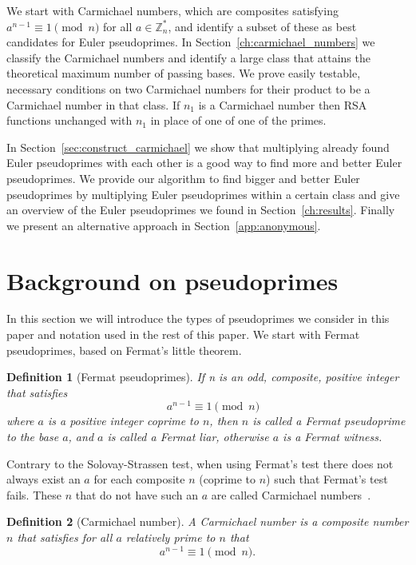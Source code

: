 \documentclass[runningheads]{amsart}
\newtheorem{definition}{Definition}
\newcommand{\Z}{\mathbb{Z}}
\begin{document}
We start with Carmichael numbers,
which are composites satisfying
$a^{n-1}\equiv
1
\pmod
n$ for all $a
\in
\Z_n^*$,
and identify a subset of these as best candidates for Euler pseudoprimes.
In
Section~\ref{ch:carmichael_numbers}
we classify the Carmichael numbers and identify a large class that attains the theoretical
maximum number of passing bases.
We prove easily testable,
necessary conditions on two Carmichael numbers for their product to be a Carmichael
number in that class.
If
$n_1$
is a Carmichael number then RSA functions unchanged with
$n_1$
in place of one of one of the primes.

In
Section~\ref{sec:construct_carmichael}
we show that multiplying already found Euler pseudoprimes with each other is a good
way to find more and better Euler pseudoprimes.
\relax
\relax
We provide our algorithm to find bigger and better Euler pseudoprimes by multiplying
Euler pseudoprimes within a certain class and give an overview of the Euler pseudoprimes
we found in
Section~\ref{ch:results}.
Finally we present an alternative approach in
Section~\ref{app:anonymous}.
\relax

\section{Background on pseudoprimes}
\relax
In this section we will introduce the types of pseudoprimes we consider in this paper
and notation used in the rest of this paper.
We start with Fermat pseudoprimes,
based on Fermat's little theorem.

\begin{definition}[Fermat pseudoprimes]
If n is an odd,
composite,
positive integer that satisfies
\[\quad a^{n-1} \equiv 1 \pmod{n}\]
where $a$ is a positive integer coprime to $n$,
then $n$ is called a Fermat pseudoprime to the base $a$,
and $a$ is called a Fermat liar,
otherwise $a$ is a Fermat witness.
\end{definition}

Contrary to the Solovay-Strassen test,
when using Fermat's test there does not always exist an $a$ for each composite $n$
(coprime to $n$) such that Fermat's test fails.
These $n$ that do not have such an $a$ are called Carmichael
numbers~\cite{Carmichael1910}.

\begin{definition}[Carmichael number]
\label{def: Carmichael number}
A Carmichael number is a composite number $n$ that satisfies for all $a$ relatively
prime to $n$ that
\[a^{n-1}\equiv1\pmod{n}.\]
\end{definition}
\end{document}
